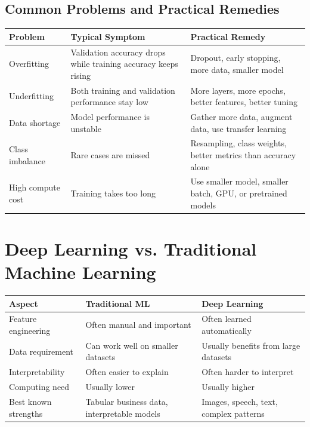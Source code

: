 \documentclass[11pt,a4paper]{article}
\begin{document}
\subsection{Common Problems and Practical Remedies}

\begin{longtable}{@{}p{3.6cm}p{4.2cm}p{5.3cm}@{}}
\toprule
\rowcolor{primary!15}
\textbf{Problem} & \textbf{Typical Symptom} & \textbf{Practical Remedy} \\
\midrule
\endhead
Overfitting & Validation accuracy drops while training accuracy keeps rising & Dropout, early stopping, more data, smaller model \\
\addlinespace
Underfitting & Both training and validation performance stay low & More layers, more epochs, better features, better tuning \\
\addlinespace
Data shortage & Model performance is unstable & Gather more data, augment data, use transfer learning \\
\addlinespace
Class imbalance & Rare cases are missed & Resampling, class weights, better metrics than accuracy alone \\
\addlinespace
High compute cost & Training takes too long & Use smaller model, smaller batch, GPU, or pretrained models \\
\bottomrule
\end{longtable}

\section{Deep Learning vs. Traditional Machine Learning}

\begin{center}
\begin{tabular}{@{}p{3.6cm}p{4.3cm}p{4.6cm}@{}}
\toprule
\textbf{Aspect} & \textbf{Traditional ML} & \textbf{Deep Learning} \\
\midrule
Feature engineering & Often manual and important & Often learned automatically \\
Data requirement & Can work well on smaller datasets & Usually benefits from large datasets \\
Interpretability & Often easier to explain & Often harder to interpret \\
Computing need & Usually lower & Usually higher \\
Best known strengths & Tabular business data, interpretable models & Images, speech, text, complex patterns \\
\bottomrule
\end{tabular}
\end{center}
\end{document}

